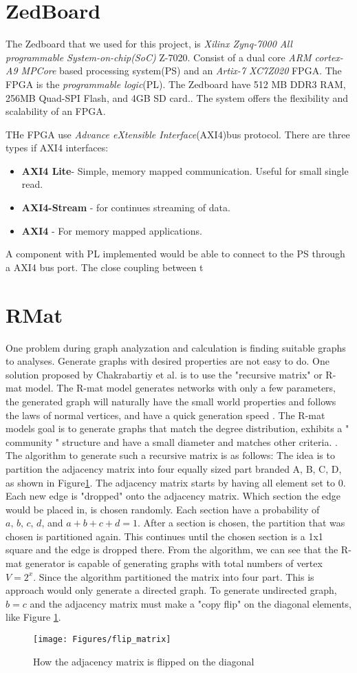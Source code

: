 \section{ZedBoard}
The Zedboard that we used for this project, is \textit{Xilinx Zynq-7000 All programmable System-on-chip(SoC)} Z-7020. Consist of a dual core \textit{ARM cortex-A9 MPCore} based processing system(PS) and an \textit{Artix-7 XC7Z020} FPGA. The FPGA is the \textit{programmable logic}(PL). The Zedboard have 512 MB DDR3 RAM, 256MB Quad-SPI Flash, and 4GB SD card.\cite{FPGASoCManual}. The system offers the flexibility and scalability of an FPGA\citep{FPGAOVERVIEW}. 

THe FPGA use \textit{Advance eXtensible Interface}(AXI4)bus protocol. There are three types if AXI4 interfaces:
\begin{itemize}
\item \textbf{AXI4 Lite}- Simple, memory mapped communication. Useful for small single read.
\item \textbf{AXI4-Stream} - for continues streaming of data.
\item \textbf{AXI4} - For memory mapped applications.
\end{itemize} 

A component with PL implemented would be able to connect to the PS through a AXI4 bus port. The close coupling between t


\section{RMat} \label{rmat}
One problem during graph analyzation and calculation is finding suitable graphs to analyses. Generate graphs with desired properties are not easy to do. One solution proposed by Chakrabartiy et al. is to use the "recursive matrix" or R-mat model. The R-mat model generates networks with only a few parameters, the generated graph will naturally have the small world properties and follows the laws of normal vertices, and have a quick generation speed \cite{Rmat2004}. The R-mat models goal is to generate graphs that match the degree distribution, exhibits a " community " structure and have a small diameter and matches other criteria. \cite{Rmat2004}. The algorithm to generate such a recursive matrix is as follows: The idea is to partition the adjacency matrix into four equally sized part branded A, B, C, D, as shown in Figure\ref{fig:flipDiagonal}. The adjacency matrix starts by having all element set to 0. Each new edge is "dropped" onto the adjacency matrix. Which section the edge would be placed in, is chosen randomly. Each section have a probability of $\textit{a, b, c, d}$, and $a + b + c + d = 1$. After a section is chosen, the partition that was chosen is partitioned again. This continues until the chosen section is a 1x1 square and the edge is dropped there. From the algorithm, we can see that the R-mat generator is capable of generating graphs with total numbers of vertex $ \textit{V} = 2^x$. Since the algorithm partitioned the matrix into four part. This is approach would only generate a directed graph. To generate undirected graph, $b = c$ and the adjacency matrix must make a "copy flip" on the diagonal elements, like Figure \ref{fig:flipDiagonal}. 

\begin{figure}
\texttt{[image: Figures/flip\_matrix]}
\caption{How the adjacency matrix is flipped on the diagonal}
\label{fig:flipDiagonal}
\end{figure}